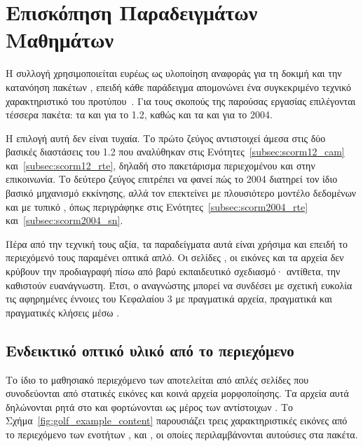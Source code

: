 \section{Επισκόπηση Παραδειγμάτων Μαθημάτων}
\label{sec:example_courses_overview}

Η συλλογή  χρησιμοποιείται ευρέως ως υλοποίηση αναφοράς για τη δοκιμή και την κατανόηση πακέτων , επειδή κάθε παράδειγμα απομονώνει ένα συγκεκριμένο τεχνικό χαρακτηριστικό του προτύπου~\cite{SCORMGolfExamples}. Για τους σκοπούς της παρούσας εργασίας επιλέγονται τέσσερα πακέτα: τα  και  για το  1.2, καθώς και τα  και  για το  2004.

Η επιλογή αυτή δεν είναι τυχαία. Το πρώτο ζεύγος αντιστοιχεί άμεσα στις δύο βασικές διαστάσεις του  1.2 που αναλύθηκαν στις Ενότητες~\ref{subsec:scorm12_cam} και~\ref{subsec:scorm12_rte}, δηλαδή στο πακετάρισμα περιεχομένου και στην  επικοινωνία. Το δεύτερο ζεύγος επιτρέπει να φανεί πώς το  2004 διατηρεί τον ίδιο βασικό μηχανισμό εκκίνησης, αλλά τον επεκτείνει με πλουσιότερο μοντέλο δεδομένων και με τυπικό , όπως περιγράφηκε στις Ενότητες~\ref{subsec:scorm2004_rte} και~\ref{subsec:scorm2004_sn}.

Πέρα από την τεχνική τους αξία, τα παραδείγματα αυτά είναι χρήσιμα και επειδή το περιεχόμενό τους παραμένει οπτικά απλό. Οι σελίδες , οι εικόνες και τα  αρχεία δεν κρύβουν την προδιαγραφή πίσω από βαρύ εκπαιδευτικό σχεδιασμό· αντίθετα, την καθιστούν ευανάγνωστη. Έτσι, ο αναγνώστης μπορεί να συνδέσει με σχετική ευκολία τις αφηρημένες έννοιες του Κεφαλαίου 3 με πραγματικά αρχεία, πραγματικά  και πραγματικές κλήσεις μέσω .

\subsection{Ενδεικτικό οπτικό υλικό από το περιεχόμενο}
\label{subsec:golf_example_visuals}

Το ίδιο το μαθησιακό περιεχόμενο των  αποτελείται από απλές σελίδες  που συνοδεύονται από στατικές εικόνες και κοινά αρχεία μορφοποίησης. Τα αρχεία αυτά δηλώνονται ρητά στο  και φορτώνονται ως μέρος των αντίστοιχων . Το Σχήμα~\ref{fig:golf_example_content} παρουσιάζει τρεις χαρακτηριστικές εικόνες από το περιεχόμενο των ενοτήτων ,  και , οι οποίες περιλαμβάνονται αυτούσιες στα πακέτα.

